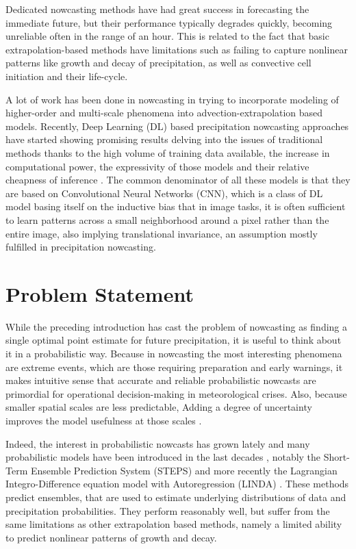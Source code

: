 Dedicated nowcasting methods have had great success in forecasting the immediate future, but their performance typically degrades quickly, becoming unreliable often in the range of an hour. This is related to the fact that basic extrapolation-based methods have limitations such as failing to capture nonlinear patterns like growth and decay of precipitation, as well as convective cell initiation and their life-cycle. 

A lot of work has been done in nowcasting in trying to incorporate modeling of higher-order and multi-scale phenomena into advection-extrapolation based models. Recently, Deep Learning (DL) based precipitation nowcasting approaches have started showing promising results delving into the issues of traditional methods thanks to the high volume of training data available, the increase in computational power, the expressivity of those models and their relative cheapness of inference \cite{shi_convolutional_2015,shi_deep_2017,ayzel_rainnet_nodate}. The common denominator of all these models is that they are based on Convolutional Neural Networks (CNN), which is a class of DL model basing itself on the inductive bias that in image tasks, it is often sufficient to learn patterns across a small neighborhood around a pixel rather than the entire image, also implying translational invariance, an assumption mostly fulfilled in precipitation nowcasting.


\section{Problem Statement}


While the preceding introduction has cast the problem of nowcasting as finding a single optimal point estimate for future precipitation, it is useful to think about it in a probabilistic way. Because in nowcasting the most interesting phenomena are extreme events, which are those requiring preparation and early warnings, it makes intuitive sense that accurate and reliable probabilistic nowcasts are primordial for operational decision-making in meteorological crises. Also, because smaller spatial scales are less predictable, Adding a degree of uncertainty improves the model usefulness at those scales \cite{germann2002scale}.

Indeed, the interest in probabilistic nowcasts has grown lately and many probabilistic models have been introduced in the last decades \cite{seed_formulation_2013, andersson1991model, schmid2002short, fox2005bayesian}, notably the Short-Term Ensemble Prediction System (STEPS) \cite{bowler_steps_2006} and more recently the Lagrangian Integro-Difference equation model with Autoregression (LINDA) \cite{pulkkinen_lagrangian_2021}. These methods predict ensembles, that are used to estimate underlying distributions of data and precipitation probabilities. They perform reasonably well, but  suffer from the same limitations as other extrapolation based methods, namely a limited ability to predict nonlinear patterns of growth and decay. 

